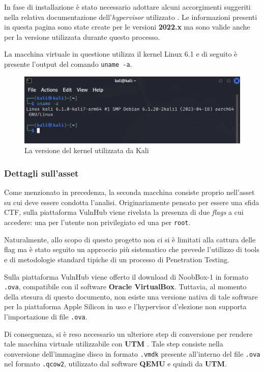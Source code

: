 \documentclass[a4paper, 12pt, oneside]{article}
\begin{document}
In fase di installazione è stato necessario adottare alcuni accorgimenti suggeriti nella relativa documentazione dell'\textit{hypervisor} utilizzato \cite{kali-utm}. Le informazioni presenti in questa pagina sono state create per le versioni \textbf{2022.x} ma sono valide anche per la versione utilizzata durante questo processo.

La macchina virtuale in questione utilizza il kernel Linux 6.1 e di seguito è presente l'output del comando \verb|uname -a|.

\begin{figure}[h]
    \centering
    \includegraphics[width=\textwidth]{img/uname.png}
    \caption{La versione del kernel utilizzata da Kali}
\end{figure}

\subsubsection{Dettagli sull'asset}
Come menzionato in precedenza, la seconda macchina consiste proprio nell'asset su cui deve essere condotta l'analisi. Originariamente pensato per essere una sfida CTF, sulla piattaforma VulnHub viene rivelata la presenza di due \textit{flags} a cui accedere: una per l'utente non privilegiato ed una per \texttt{root}. 

Naturalmente, allo scopo di questo progetto non ci si è limitati alla cattura delle flag ma è stato seguito un approccio più sistematico che prevede l'utilizzo di tools e di metodologie standard tipiche di un processo di Penetration Testing.

Sulla piattaforma VulnHub viene offerto il download di NoobBox-1 in formato \texttt{.ova}, compatibile con il software \textbf{Oracle VirtualBox}. Tuttavia, al momento della stesura di questo documento, non esiste una versione nativa di tale software per la piattaforma Apple Silicon in uso e l'hypervisor d'elezione non supporta l'importazione di file \texttt{.ova}. 

Di conseguenza, si è reso necessario un ulteriore step di conversione per rendere tale macchina virtuale utilizzabile con \textbf{UTM} \cite{qcow}. Tale step consiste nella conversione dell'immagine disco in formato \texttt{.vmdk} presente all'interno del file \texttt{.ova} nel formato \texttt{.qcow2}, utilizzato dal software \textbf{QEMU} e quindi da \textbf{UTM}.
\end{document}
